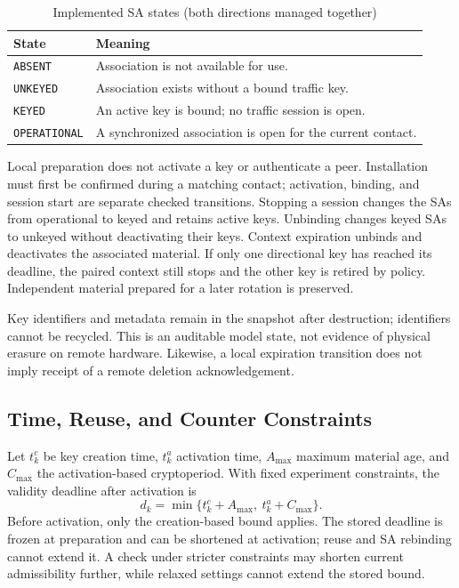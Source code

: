\documentclass[conference]{IEEEtran}
\begin{document}
\begin{table}[t]
\caption{Implemented SA states (both directions managed together)}
\label{tab:states}
\centering
\footnotesize
\begin{tabular}{@{}p{}p{}@{}}
\toprule
\textbf{State} & \textbf{Meaning} \\
\midrule
\texttt{ABSENT} & Association is not available for use. \\
\texttt{UNKEYED} & Association exists without a bound traffic key. \\
\texttt{KEYED} & An active key is bound; no traffic session is open. \\
\texttt{OPERATIONAL} & A synchronized association is open for the current contact. \\
\bottomrule
\end{tabular}
\end{table}

Local preparation does not activate a key or authenticate a peer. Installation must first be confirmed during a matching contact; activation, binding, and session start are separate checked transitions. Stopping a session changes the SAs from operational to keyed and retains active keys. Unbinding changes keyed SAs to unkeyed without deactivating their keys. Context expiration unbinds and deactivates the associated material. If only one directional key has reached its deadline, the paired context still stops and the other key is retired by policy. Independent material prepared for a later rotation is preserved.

Key identifiers and metadata remain in the snapshot after destruction; identifiers cannot be recycled. This is an auditable model state, not evidence of physical erasure on remote hardware. Likewise, a local expiration transition does not imply receipt of a remote deletion acknowledgement.

\subsection{Time, Reuse, and Counter Constraints}
Let $t_k^c$ be key creation time, $t_k^a$ activation time, $A_{\max}$ maximum material age, and $C_{\max}$ the activation-based cryptoperiod. With fixed experiment constraints, the validity deadline after activation is
\begin{equation}
d_k = \min\{t_k^c+A_{\max},\ t_k^a+C_{\max}\}.
\label{eq:deadline}
\end{equation}
Before activation, only the creation-based bound applies. The stored deadline is frozen at preparation and can be shortened at activation; reuse and SA rebinding cannot extend it. A check under stricter constraints may shorten current admissibility further, while relaxed settings cannot extend the stored bound.
\end{document}
